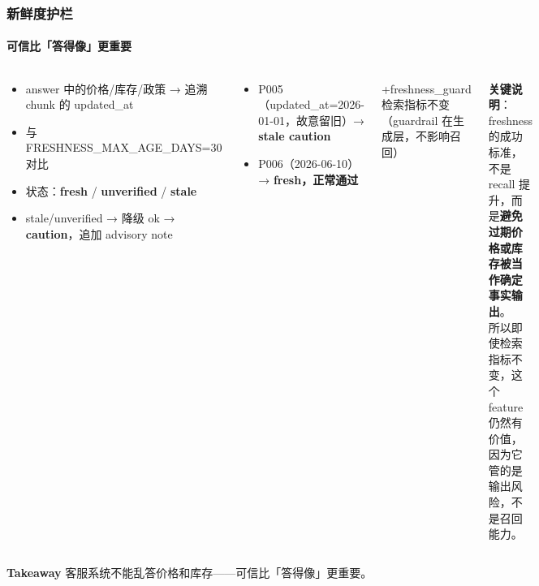 \documentclass[aspectratio=169,10pt]{beamer}
\newcommand{\takeaway}[1]{%
  \vfill%
  \begin{tcolorbox}[
    colback=Ctakebg, colframe=Ctakebg,
    arc=0pt, boxrule=0pt,
    left=7pt, right=7pt, top=4pt, bottom=4pt,
    width=\textwidth, nobeforeafter
  ]%
    {\scriptsize\color{white}\textbf{Takeaway}\enspace%
     \color{white!88!Ctakebg}#1}%
  \end{tcolorbox}%
}
\newcommand{\hi}[1]{{\bfseries\color{Cgreen}#1}}      %
\newcommand{\bad}[1]{{\bfseries\color{Cred}#1}}       %
\newcommand{\mono}[1]{{\ttfamily\small\color{Cblue!90!black}#1}}  %
\begin{document}
\begin{frame}
\frametitle{新鲜度护栏}
\framesubtitle{可信比「答得像」更重要}

\begin{columns}[T]
\begin{tcolorbox}[tcgray, title={\color{Ctextdark}机制}]
\small\begin{itemize}\setlength\itemsep{0.3em}
  \item answer 中的价格/库存/政策 → 追溯\\chunk 的 \mono{updated\_at}
  \item 与 \mono{FRESHNESS\_MAX\_AGE\_DAYS=30} 对比
  \item 状态：\hi{fresh} / {\bfseries\color{orange}unverified} / \bad{stale}
  \item stale/unverified → 降级 ok → {\bfseries\color{orange}caution}，追加 advisory note
\end{itemize}
\end{tcolorbox}
\vspace{0.2cm}
\begin{tcolorbox}[tcgray, title={\color{Ctextdark}演示}]
\small\begin{itemize}\setlength\itemsep{0.2em}
  \item P005（\mono{updated\_at=2026-01-01}，故意留旧）→ \bad{stale caution}
  \item P006（\mono{2026-06-10}）→ \hi{fresh，正常通过}
\end{itemize}
\end{tcolorbox}

\begin{tcolorbox}[tcgreen, title={\color{Cgreen}Ablation 验证}]
\small
+freshness\_guard 检索指标不变\\
（guardrail 在生成层，不影响召回）
\end{tcolorbox}
\vspace{0.2cm}
\begin{tcolorbox}[tcblue]
\small\textbf{关键说明}：freshness 的成功标准，不是 recall 提升，而是\textbf{避免过期价格或库存被当作确定事实输出}。\\[0.3em]
所以即使检索指标不变，这个 feature 仍然有价值，因为它管的是输出风险，不是召回能力。
\end{tcolorbox}
\end{columns}

\takeaway{客服系统不能乱答价格和库存——可信比「答得像」更重要。}
\end{frame}
\end{document}
